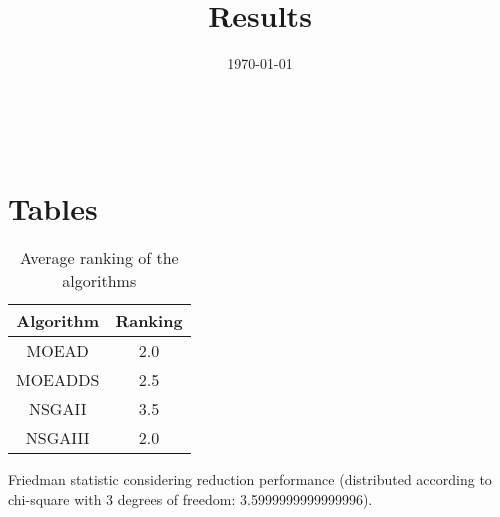\documentclass{article}
\title{Results}
\author{}
\date{\today}
\begin{document}
\oddsidemargin 0in \topmargin 0in\maketitle
\
\section{Tables}
\begin{table}[!htp]
\centering
\caption{Average ranking of the algorithms}
\begin{tabular}{c|c}
Algorithm&Ranking\\
\hline
MOEAD&2.0\\
MOEADDS&2.5\\
NSGAII&3.5\\
NSGAIII&2.0\\
\end{tabular}
\end{table}


Friedman statistic considering reduction performance (distributed according to chi-square with 3 degrees of freedom: 3.5999999999999996).
\end{document}
